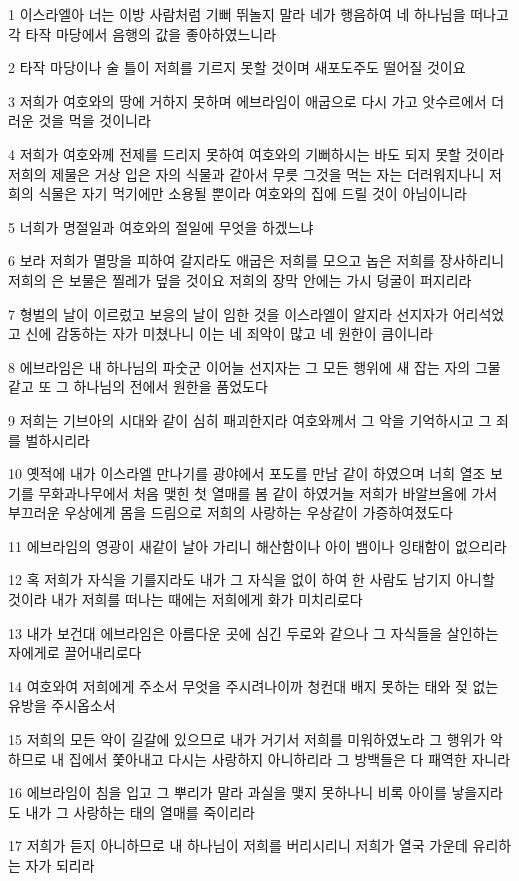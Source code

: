\par 1 이스라엘아 너는 이방 사람처럼 기뻐 뛰놀지 말라 네가 행음하여 네 하나님을 떠나고 각 타작 마당에서 음행의 값을 좋아하였느니라
\par 2 타작 마당이나 술 틀이 저희를 기르지 못할 것이며 새포도주도 떨어질 것이요
\par 3 저희가 여호와의 땅에 거하지 못하며 에브라임이 애굽으로 다시 가고 앗수르에서 더러운 것을 먹을 것이니라
\par 4 저희가 여호와께 전제를 드리지 못하여 여호와의 기뻐하시는 바도 되지 못할 것이라 저희의 제물은 거상 입은 자의 식물과 같아서 무릇 그것을 먹는 자는 더러워지나니 저희의 식물은 자기 먹기에만 소용될 뿐이라 여호와의 집에 드릴 것이 아님이니라
\par 5 너희가 명절일과 여호와의 절일에 무엇을 하겠느냐
\par 6 보라 저희가 멸망을 피하여 갈지라도 애굽은 저희를 모으고 놉은 저희를 장사하리니 저희의 은 보물은 찔레가 덮을 것이요 저희의 장막 안에는 가시 덩굴이 퍼지리라
\par 7 형벌의 날이 이르렀고 보응의 날이 임한 것을 이스라엘이 알지라 선지자가 어리석었고 신에 감동하는 자가 미쳤나니 이는 네 죄악이 많고 네 원한이 큼이니라
\par 8 에브라임은 내 하나님의 파숫군 이어늘 선지자는 그 모든 행위에 새 잡는 자의 그물 같고 또 그 하나님의 전에서 원한을 품었도다
\par 9 저희는 기브아의 시대와 같이 심히 패괴한지라 여호와께서 그 악을 기억하시고 그 죄를 벌하시리라
\par 10 옛적에 내가 이스라엘 만나기를 광야에서 포도를 만남 같이 하였으며 너희 열조 보기를 무화과나무에서 처음 맺힌 첫 열매를 봄 같이 하였거늘 저희가 바알브올에 가서 부끄러운 우상에게 몸을 드림으로 저희의 사랑하는 우상같이 가증하여졌도다
\par 11 에브라임의 영광이 새같이 날아 가리니 해산함이나 아이 뱀이나 잉태함이 없으리라
\par 12 혹 저희가 자식을 기를지라도 내가 그 자식을 없이 하여 한 사람도 남기지 아니할 것이라 내가 저희를 떠나는 때에는 저희에게 화가 미치리로다
\par 13 내가 보건대 에브라임은 아름다운 곳에 심긴 두로와 같으나 그 자식들을 살인하는 자에게로 끌어내리로다
\par 14 여호와여 저희에게 주소서 무엇을 주시려나이까 청컨대 배지 못하는 태와 젖 없는 유방을 주시옵소서
\par 15 저희의 모든 악이 길갈에 있으므로 내가 거기서 저희를 미워하였노라 그 행위가 악하므로 내 집에서 쫓아내고 다시는 사랑하지 아니하리라 그 방백들은 다 패역한 자니라
\par 16 에브라임이 침을 입고 그 뿌리가 말라 과실을 맺지 못하나니 비록 아이를 낳을지라도 내가 그 사랑하는 태의 열매를 죽이리라
\par 17 저희가 듣지 아니하므로 내 하나님이 저희를 버리시리니 저희가 열국 가운데 유리하는 자가 되리라

